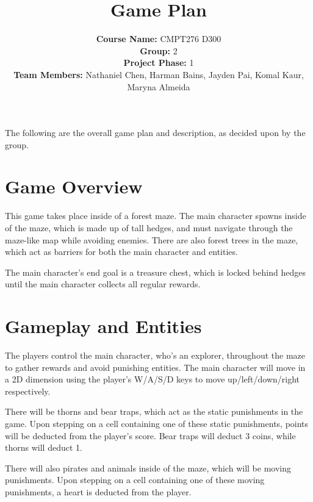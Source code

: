 \documentclass[10pt,letterpaper]{article}
\title{Game Plan}
\begin{document}
\maketitle

\author{
\begin{center}
\textbf{Course Name:}   CMPT276 D300 \\
\textbf{Group:}         2 \\
\textbf{Project Phase:} 1 \\ 
\textbf{Team Members:}  Nathaniel Chen, Harman Bains, Jayden Pai, Komal Kaur, Maryna Almeida
\end{center}
}

\bigskip
The following are the overall game plan and description, as decided upon by the group.

\section{Game Overview}
    This game takes place inside of a forest maze. The main character spawns inside of the maze, which is made up of tall hedges, and must navigate through the maze-like map while avoiding enemies. There are also forest trees in the maze, which act as barriers for both the main character and entities.

    The main character's end goal is a treasure chest, which is locked behind hedges until the main character collects all regular rewards.

\section{Gameplay and Entities}
    The players control the main character, who's an explorer, throughout the maze to gather rewards and avoid punishing entities. The main character will move in a 2D dimension using the player's W/A/S/D keys to move up/left/down/right respectively.

    There will be thorns and bear traps, which act as the static punishments in the game. Upon stepping on a cell containing one of these static punishments, points will be deducted from the player's score. Bear traps will deduct 3 coins, while thorns will deduct 1.

    There will also pirates and animals inside of the maze, which will be moving punishments. Upon stepping on a cell containing one of these moving punishments, a heart is deducted from the player.
\end{document}
